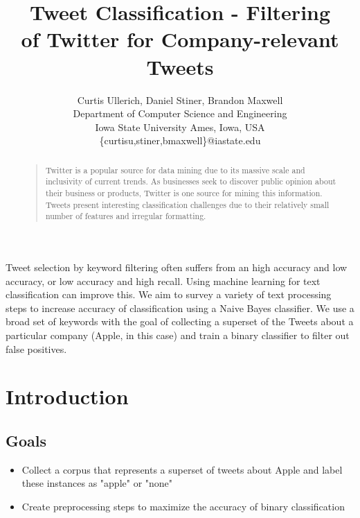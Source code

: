 \documentclass[letterpaper]{article}
\begin{document}
\title{Tweet Classification - Filtering \\ of Twitter for Company-relevant Tweets}
\author{
Curtis Ullerich, Daniel Stiner, Brandon Maxwell\\
Department of Computer Science and Engineering\\
Iowa State University
Ames, Iowa, USA\\
\{curtisu,stiner,bmaxwell\}@iastate.edu\\
}
\maketitle
\begin{abstract}
\begin{quote}
Twitter is a popular source for data mining due to its massive scale and inclusivity of current trends. As businesses seek to discover public opinion about their business or products, Twitter is one source for mining this information. Tweets present interesting classification challenges due to their relatively small number of features and irregular formatting.
\end{quote}
\end{abstract}

\noindent Tweet selection by keyword filtering often suffers from an high accuracy and low accuracy, or low accuracy and high recall. Using machine learning for text classification can improve this. We aim to survey a variety of text processing steps to increase accuracy of classification using a Naive Bayes classifier. We use a broad set of keywords with the goal of collecting a superset of the Tweets about a particular company (Apple, in this case) and train a binary classifier to filter out false positives.

\section{Introduction}

\subsection{Goals}

\begin{itemize}

\item Collect a corpus that represents a superset of tweets about Apple and label these instances as "apple" or "none"
\item Create preprocessing steps to maximize the accuracy of binary classification

\end{itemize}
\end{document}
